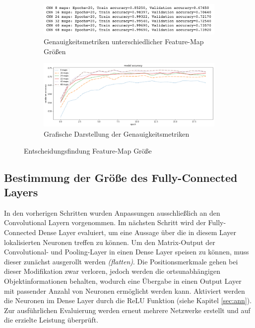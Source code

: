 \begin{figure}[htb]
	\centering
	\begin{subfigure}[ht]{.9\textwidth}
		\includegraphics[width=\textwidth]{images/featuremap_result}
		\caption{Genauigkeitsmetriken unterschiedlicher Feature-Map Größen}
		\label{fig:featuremap_results}
	\end{subfigure}\hfill%
	\begin{subfigure}[ht]{.9\textwidth}
		\includegraphics[width=\textwidth]{images/featuremap_result_graph}
		\caption{Grafische Darstellung der Genauigkeitsmetriken}
		\label{fig:featuremap_graph_results}
	\end{subfigure}\hfill%
	\caption{Entscheidungsfindung Feature-Map Größe}
\end{figure}

\subsection{Bestimmung der Größe des Fully-Connected Layers}

In den vorherigen Schritten wurden Anpassungen ausschließlich an den Convolutional Layern vorgenommen. Im nächsten Schritt wird der Fully-Connected Dense Layer evaluiert, um eine Aussage über die in diesem Layer lokalisierten Neuronen treffen zu können. Um den Matrix-Output der Convolutional- und Pooling-Layer in einen Dense Layer speisen zu können, muss dieser zunächst ausgerollt werden \emph{(flatten)}. Die Positionsmerkmale gehen bei dieser Modifikation zwar verloren, jedoch werden die ortsunabhängigen Objektinformationen behalten, wodurch eine Übergabe in einen Output Layer mit passender Anzahl von Neuronen ermöglicht werden kann. Aktiviert werden die Neuronen im Dense Layer durch die \ac{ReLU} Funktion (siehe Kapitel \ref{sec:ann}). Zur ausführlichen Evaluierung werden erneut mehrere Netzwerke erstellt und auf die erzielte Leistung überprüft. 

